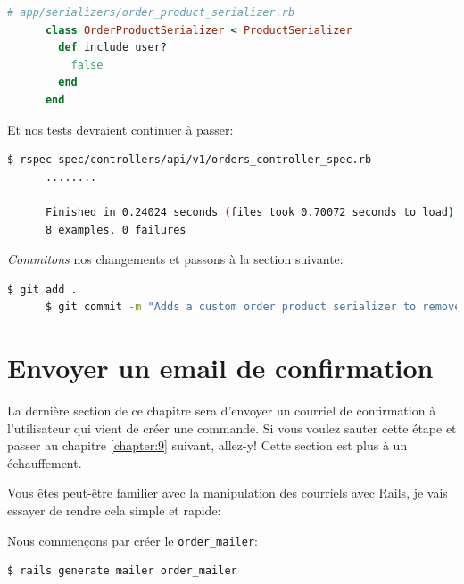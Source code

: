 \documentclass[]{report}
\begin{document}
    \begin{scriptsize}
      \begin{lstlisting}[language=ruby]
      # app/serializers/order_product_serializer.rb
      class OrderProductSerializer < ProductSerializer
        def include_user?
          false
        end
      end
      \end{lstlisting}
    \end{scriptsize}

    Et nos tests devraient continuer à passer:

    \begin{scriptsize}
      \begin{lstlisting}[language=bash]
      $ rspec spec/controllers/api/v1/orders_controller_spec.rb
      ........

      Finished in 0.24024 seconds (files took 0.70072 seconds to load)
      8 examples, 0 failures
      \end{lstlisting}
    \end{scriptsize}

    \textit{Commitons} nos changements et passons à la section suivante:

    \begin{scriptsize}
      \begin{lstlisting}[language=bash]
      $ git add .
      $ git commit -m "Adds a custom order product serializer to remove the user association"
      \end{lstlisting}
    \end{scriptsize}

  \section{Envoyer un email de confirmation}

    La dernière section de ce chapitre sera d'envoyer un courriel de confirmation à l'utilisateur qui vient de créer une commande. Si vous voulez sauter cette étape et passer au chapitre \ref{chapter:9} suivant, allez-y! Cette section est plus à un échauffement.

    Vous êtes peut-être familier avec la manipulation des courriels avec Rails, je vais essayer de rendre cela simple et rapide:

    Nous commençons par créer le \verb|order_mailer|:

    \begin{scriptsize}
      \begin{lstlisting}[language=bash]
      $ rails generate mailer order_mailer
      \end{lstlisting}
    \end{scriptsize}
\end{document}
